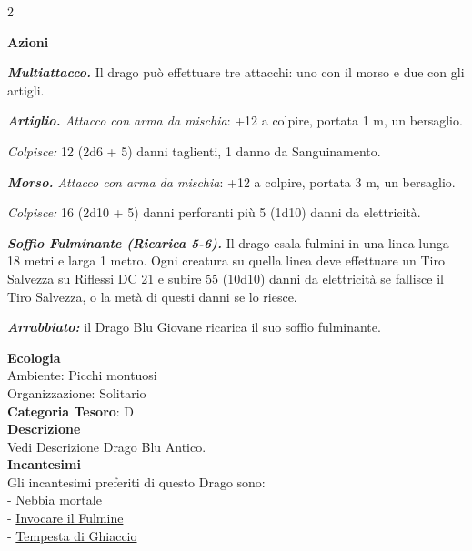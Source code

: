 \begin{multicols}{2}
{\textbf{Azioni}

\emph{\textbf{Multiattacco.}} Il drago può effettuare tre attacchi: uno con il morso e due con gli artigli.

\emph{\textbf{Artiglio.} Attacco con arma da mischia}: +12 a colpire, portata 1 m, un bersaglio.

\emph{Colpisce:} 12 (2d6 + 5) danni taglienti, 1 danno da Sanguinamento.

\emph{\textbf{Morso.} Attacco con arma da mischia}: +12 a colpire, portata 3 m, un bersaglio.

\emph{Colpisce:} 16 (2d10 + 5) danni perforanti più 5 (1d10) danni da elettricità.

\emph{\textbf{Soffio Fulminante (Ricarica 5-6).}} Il drago esala fulmini in una linea lunga 18 metri e larga 1 metro. Ogni creatura su quella linea deve effettuare un Tiro Salvezza su Riflessi DC 21 e subire 55 (10d10) danni da elettricità se fallisce il Tiro Salvezza, o la metà di questi danni se lo riesce.

\emph{\textbf{Arrabbiato:}} il Drago Blu Giovane ricarica il suo soffio fulminante.

\textbf{Ecologia}\\
Ambiente: Picchi montuosi\\
Organizzazione: Solitario\\
\textbf{Categoria Tesoro}: D\\
\textbf{Descrizione}\\
Vedi Descrizione Drago Blu Antico.\\
\textbf{Incantesimi}\\
Gli incantesimi preferiti di questo Drago sono:\\
- \hyperlink{Nebbia mortale}{Nebbia mortale}\\
- \hyperlink{Invocare il Fulmine}{Invocare il Fulmine}\\
- \hyperlink{Tempesta di Ghiaccio}{Tempesta di Ghiaccio}

}
\end{multicols}
